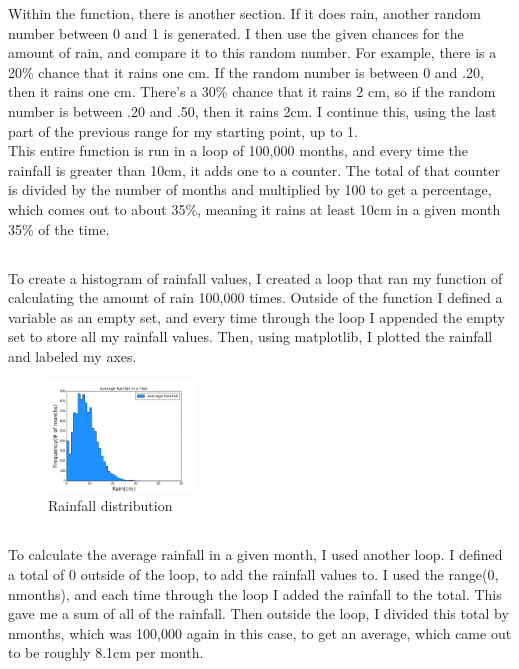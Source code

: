 \documentclass[twocolumn]{revtex4}
\begin{document}
Within the function, there is another section. If it does rain, another random number between 0 and 1 is generated. I then use the given chances for the amount of rain, and compare it to this random number. For example, there is a 20\% chance that it rains one cm. If the random number is between 0 and .20, then it rains one cm. There's a 30\% chance that it rains 2 cm, so if the random number is between .20 and .50, then it rains 2cm. I continue this, using the last part of the previous range for my starting point, up to 1.\\
This entire function is run in a loop of 100,000 months, and every time the rainfall is greater than 10cm, it adds one to a counter. The total of that counter is divided by the number of months and multiplied by 100 to get a percentage, which comes out to about 35\%, meaning it rains at least 10cm in a given month 35\% of the time. 
\subsection{}
To create a histogram of rainfall values, I created a loop that ran my function of calculating the amount of rain 100,000 times. Outside of the function I defined a variable as an empty set, and every time through the loop I appended the empty set to store all my rainfall values. Then, using matplotlib, I plotted the rainfall and labeled my axes.
\begin{figure}[h]
\centering
\includegraphics[width=0.35\textwidth]{avg_rain_graph.png}
\caption{Rainfall distribution}
\end{figure}
\subsection{}
To calculate the average rainfall in a given month, I used another loop. I defined a total of 0 outside of the loop, to add the rainfall values to. I used the range(0, nmonths), and each time through the loop I added the rainfall to the total. This gave me a sum of all of the rainfall. Then outside the loop, I divided this total by nmonths, which was 100,000 again in this case, to get an average, which came out to be roughly 8.1cm per month.
\end{document}
